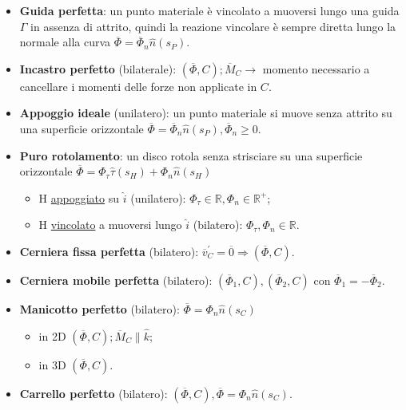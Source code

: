\documentclass{book}
\theoremstyle{plain}
\theoremstyle{plain}
\theoremstyle{plain}
\theoremstyle{plain}
\theoremstyle{plain}
\theoremstyle{definition}
\theoremstyle{remark}
\theoremstyle{definition}
\begin{document}
\begin{itemize}
    \item \textbf{Guida perfetta}: un punto materiale è vincolato a muoversi lungo una guida $\Gamma$ in assenza di attrito, quindi la reazione vincolare è sempre diretta lungo la normale alla curva $\overline{\Phi}=\overline{\Phi}_{n} \hat{n}(s_P)$.
    \item \textbf{Incastro perfetto} (bilaterale): $\left(\overline{\Phi}, C\right); \overline{M}_{C} \longrightarrow$ momento necessario a cancellare i momenti delle forze non applicate in $C$.
    \item \textbf{Appoggio ideale} (unilatero): un punto materiale si muove senza attrito su una superficie orizzontale $\overline{\Phi}=\overline{\Phi}_{n} \hat{n}(s_P), \overline{\Phi}_n \geq 0$.
    \item \textbf{Puro rotolamento}: un disco rotola senza strisciare su una superficie orizzontale $\overline{\Phi}=\Phi_{\tau} \hat{\tau}(s_H)+\Phi_{n} \hat{n}(s_H)$
    \begin{itemize}
        \item H \underline{appoggiato} su $\hat{i}$ (unilatero): $\Phi_{\tau} \in \mathbb{R}, \Phi_{n} \in \mathbb{R}^{+}$;
        \item H \underline{vincolato} a muoversi lungo $\hat{i}$ (bilatero): $\Phi_{\tau}, \Phi_{n} \in \mathbb{R}$.
    \end{itemize}
    \item \textbf{Cerniera fissa perfetta} (bilatero): $\overline{v}_{C}^{\prime}=\overline{0} \Longrightarrow \left(\overline{\Phi}, C\right)$.
    \item \textbf{Cerniera mobile perfetta} (bilatero): $\left(\overline{\Phi}_{1}, C\right), \left(\overline{\Phi}_{2}, C\right)$ con $\overline{\Phi}_{1}=-\overline{\Phi}_{2}$.
    \item \textbf{Manicotto perfetto} (bilatero): $\overline{\Phi}=\Phi_{n} \hat{n}(s_C)$
    \begin{itemize}
        \item in 2D $\left(\overline{\Phi}, C\right); \overline{M}_{C} \parallel\hat{k}$;
        \item in 3D $\left(\overline{\Phi}, C\right)$.
    \end{itemize}
    \item \textbf{Carrello perfetto} (bilatero): $\left(\overline{\Phi}, C\right), \overline{\Phi}=\Phi_{n} \hat{n}(s_C)$.
\end{itemize}
\end{document}
